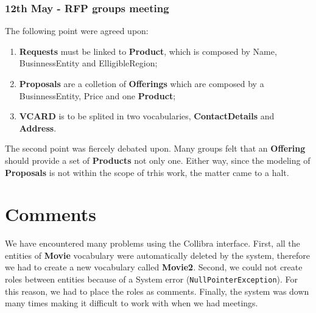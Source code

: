 \documentclass[a4paper,10pt]{article}
\begin{document}
\subsubsection*{12th May - RFP groups meeting}
The following point were agreed upon:
\begin{enumerate}
  \item \textbf{Requests} must be linked to \textbf{Product}, which is composed by Name, BusinnessEntity and ElligibleRegion;
  \item \textbf{Proposals} are a colletion of \textbf{Offerings} which are composed by a BusinnessEntity, Price and one \textbf{Product};
  \item \textbf{VCARD} is to be splited in two vocabularies, \textbf{ContactDetails} and \textbf{Address}.
\end{enumerate}
The second point was fiercely debated upon. Many groups felt that an \textbf{Offering} should provide a set of \textbf{Products} not only one. Either way, since the modeling of \textbf{Proposals} is not within the scope of trhis work, the matter came to a halt.


\section{Comments}
We have encountered many problems using the Collibra interface. First, all the entities of \textbf{Movie} vocabulary were automatically deleted by the system, therefore we had to create a new vocabulary called \textbf{Movie2}. Second, we could not create roles between entities because of a System error (\verb+NullPointerException+). For this reason, we had to place the roles as comments. Finally, the system was down many times making it difficult to work with when we had meetings. 
\end{document}
